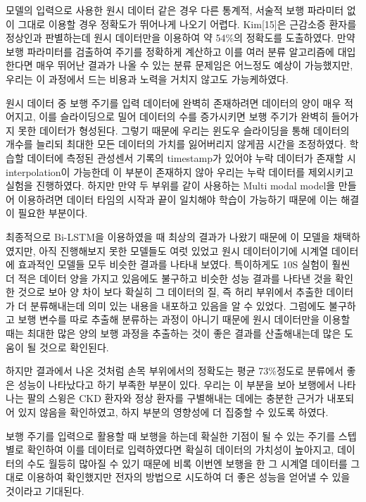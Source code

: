 \documentclass{article}
\begin{document}
모델의 입력으로 사용한 원시 데이터 같은 경우 다른 통계적, 서술적 보행 파라미터 없이 그대로 이용할 경우 정확도가 뛰어나게 나오기 어렵다.
Kim{[}15{]}은 근감소증 환자를 정상인과 판별하는데 원시 데이터만을
이용하여 약 54\%의 정확도를 도출하였다. 만약 보행 파라미터를 검출하여
주기를 정확하게 계산하고 이를 여러 분류 알고리즘에 대입한다면 매우
뛰어난 결과가 나올 수 있는 분류 문제임은 어느정도 예상이 가능했지만,
우리는 이 과정에서 드는 비용과 노력을 거치지 않고도 가능케하였다.

원시 데이터 중 보행 주기를 입력 데이터에 완벽히 존재하려면 데이터의 양이
매우 적어지고, 이를 슬라이딩으로 밀어 데이터의 수를 증가시키면 보행
주기가 완벽히 들어가지 못한 데이터가 형성된다. 그렇기 때문에 우리는
윈도우 슬라이딩을 통해 데이터의 개수를 늘리되 최대한 모든 데이터의
가치를 잃어버리지 않게끔 시간을 조정하였다. 학습할 데이터에 측정된
관성센서 기록의 timestamp가 있어야 누락 데이터가 존재할 시
interpolation이 가능한데 이 부분이 존재하지 않아 우리는 누락 데이터를
제외시키고 실험을 진행하였다. 하지만 만약 두 부위를 같이 사용하는 Multi
modal model을 만들어 이용하려면 데이터 타임의 시작과 끝이 일치해야
학습이 가능하기 때문에 이는 해결이 필요한 부분이다.

최종적으로 Bi-LSTM을 이용하였을 때 최상의 결과가 나왔기 때문에 이 모델을
채택하였지만, 아직 진행해보지 못한 모델들도 여럿 있었고 원시
데이터이기에 시계열 데이터에 효과적인 모델들 모두 비슷한 결과를 나타내
보였다. 특이하게도 10S 실험이 훨씬 더 적은 데이터 양을 가지고 있음에도
불구하고 비슷한 성능 결과를 나타낸 것을 확인한 것으로 보아 양 차이 보다
확실히 그 데이터의 질, 즉 허리 부위에서 추출한 데이터가 더 분류해내는데
의미 있는 내용을 내포하고 있음을 알 수 있었다. 그럼에도 불구하고 보행
변수를 따로 추출해 분류하는 과정이 아니기 때문에 원시 데이터만을 이용할
때는 최대한 많은 양의 보행 과정을 추출하는 것이 좋은 결과를 산출해내는데
많은 도움이 될 것으로 확인된다.

하지만 결과에서 나온 것처럼 손목 부위에서의 정확도는 평균 73\%정도로
분류에서 좋은 성능이 나타났다고 하기 부족한 부분이 있다. 우리는 이
부분을 보아 보행에서 나타나는 팔의 스윙은 CKD 환자와 정상 환자를
구별해내는 데에는 충분한 근거가 내포되어 있지 않음을 확인하였고, 하지
부분의 영향성에 더 집중할 수 있도록 하였다.

보행 주기를 입력으로 활용할 때 보행을 하는데 확실한 기점이 될 수 있는
주기를 스텝 별로 확인하여 이를 데이터로 입력하였다면 확실히 데이터의
가치성이 높아지고, 데이터의 수도 월등히 많아질 수 있기 때문에 비록
이번엔 보행을 한 그 시계열 데이터를 그대로 이용하여 확인했지만 전자의
방법으로 시도하여 더 좋은 성능을 얻어낼 수 있을 것이라고 기대된다.
\end{document}
